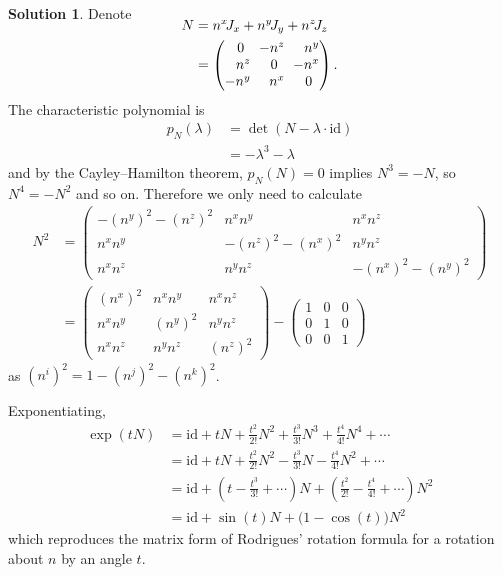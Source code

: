 \documentclass[11pt, a4paper]{report}
\theoremstyle{definition}
\newtheorem{sol}{Solution}[part]
\newcommand*{\ralminus}{\ensuremath\:\, \mathllap{-}}
\begin{document}
\begin{sol}
Denote
\begin{align*}
    \SwapAboveDisplaySkip
    N &= n^x \! J_x + n^y \! J_y + n^z \! J_z \\
      &= \begin{pmatrix*}[r]
            0 \phantom{^z} & \ralminus n^z  & n^y \\
            n^z            & 0 \phantom{^x} & \ralminus n^x \\
            -n^y           & n^x            & 0 \phantom{^x}
         \end{pmatrix*}.
\end{align*}
The characteristic polynomial is
\begin{align*}
    p_N(\lambda) &= \det(N - \lambda \cdot \text{id}) \\
        &= -\lambda^3 - \lambda
\end{align*}
and by the Cayley--Hamilton theorem, $p_N(N) = 0$ implies $N^3 = -N$, so $N^4 = -N^2$ and so on.
Therefore we only need to calculate
\begin{align*}
    N^2 &= \begin{pmatrix}
        -{(n^y)}^2 - {(n^z)}^2 & n^x n^y & n^x n^z \\
        n^x n^y & -{(n^z)}^2 - {(n^x)}^2 & n^y n^z \\
        n^x n^z & n^y n^z                & -{(n^x)}^2 - {(n^y)}^2
    \end{pmatrix} \\
       &= \begin{pmatrix}
        {(n^x)}^2 & n^x n^y   & n^x n^z \\
        n^x n^y   & {(n^y)}^2 & n^y n^z \\
        n^x n^z   & n^y n^z   & {(n^z)}^2
    \end{pmatrix}
    - \begin{pmatrix}
        1 & 0 & 0 \\
        0 & 1 & 0 \\
        0 & 0 & 1
    \end{pmatrix}
\end{align*}
as ${(n^i)}^2 = 1 - {(n^j)}^2 - {(n^k)}^2$.

Exponentiating,
\begin{align*}
    \exp (tN)
        &= \text{id} + tN + \frac{t^2}{2!} N^2 + \frac{t^3}{3!} N^3
                     + \frac{t^4}{4!} N^4 + \cdots \\
        &= \text{id} + tN + \frac{t^2}{2!} N^2 - \frac{t^3}{3!} N
                     - \frac{t^4}{4!} N^2 + \cdots \\
        &= \text{id} + \left( t - \frac{t^3}{3!} + \cdots \right) N
              + \left( \frac{t^2}{2!} - \frac{t^4}{4!} + \cdots \right) N^2 \\
        &= \text{id} + \sin(t) N + \bigl(1 - \cos(t) \bigr) N^2
\end{align*}
which reproduces the matrix form of Rodrigues' rotation formula for a rotation about $n$ by an angle $t$.


\end{sol}
\end{document}
